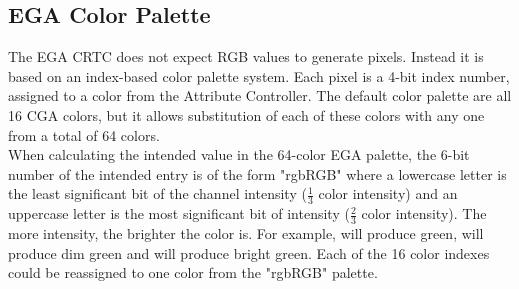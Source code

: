 \documentclass[book.tex]{subfiles}
\begin{document}
  
\subsection{EGA Color Palette}
\label{sec:ega_color_palette}
The EGA CRTC does not expect RGB values to generate pixels. Instead it is based on an index-based color palette system. Each pixel is a 4-bit index number, assigned to a color from the Attribute Controller. The default color palette are all 16 CGA colors, but it allows substitution of each of these colors with any one from a total of 64 colors.\\

When calculating the intended value in the 64-color EGA palette, the 6-bit number of the intended entry is of the form "rgbRGB" where a lowercase letter is the least significant bit of the channel intensity (\(\frac{1}{3}\) color intensity) and an uppercase letter is the most significant bit of intensity (\(\frac{2}{3}\) color intensity). The more intensity, the brighter the color is. For example,  will produce green,  will produce dim green and  will produce bright green. Each of the 16 color indexes could be reassigned to one color from the "rgbRGB" palette.
 
\end{document}
